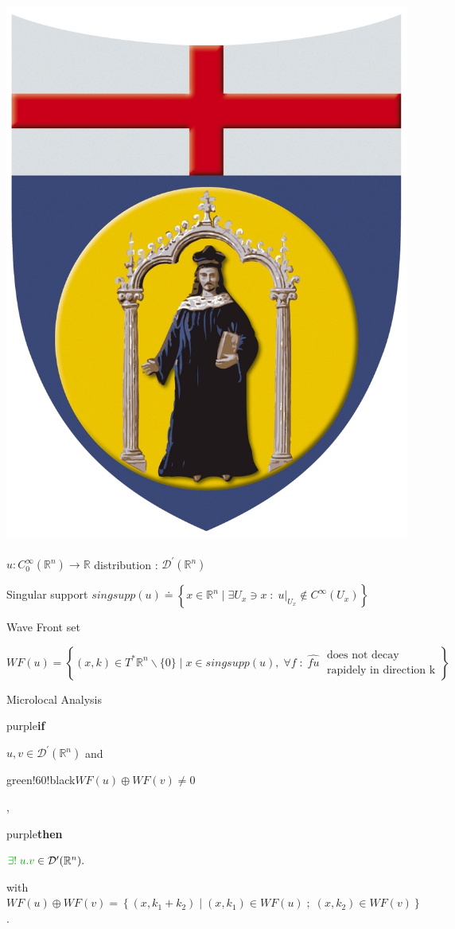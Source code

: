 \documentclass[a4paper,11pt]{beamer} %
\newcommand{\LogoUnivGenova}{\protect\includegraphics[scale=0.015]{fig_genova.JPG}} %
\begin{document}
\begin{frame}
\frametitle{\LogoUnivGenova {} \cite{Hormander1990}}
$u : C^{\infty}_{0}(\mathbb{R}^n) \to \mathbb{R}$ \; distribution : $\mathcal{D}^{\prime}(\mathbb{R}^n)$
\medskip
\begin{block}{Singular support}
$singsupp(u) \doteq \left\{ x \in \mathbb{R}^n \; | \; \exists U_x \ni x \; : \; u|_{U_x} \notin C^{\infty}(U_x) \right\}$ 
\end{block}
\medskip
\begin{block}{Wave Front set}
\begin{scriptsize}
$WF (u) = \left\{ (x,k) \in T^{\ast}\mathbb{R}^n \backslash \{0\} \; | \; x \in singsupp(u), \; \forall f \; : \; \hat{fu} \;
\begin{array}{l} \text{does not decay} \\ \text{rapidely in direction k} \end{array}\right\}$
\end{scriptsize}
\end{block}
\begin{block}{Microlocal Analysis} 
\vspace{-4mm}
\begin{center}
\begin{color}{purple}\textbf{if}\end{color} $u,v \in \mathcal{D}^{\prime}(\mathbb{R}^n)$ and \begin{color}{green!60!black}$WF(u) \oplus WF(v) \neq 0$\end{color}, \\
\begin{color}{purple}\textbf{then}\end{color} $\begin{color}{green!60!black}\exists! \; u.v \end{color}\in \mathcal{D}^{\prime}(\mathbb{R}^n).$
\end{center}
\begin{scriptsize}
with $WF(u) \oplus WF(v) = \left\{ (x,k_1 + k_2) \; | \; (x,k_1) \in WF(u) \; ; \; (x,k_2) \in WF(v) \right\}$.
\end{scriptsize}
\end{block}
\end{frame}
\end{document}
